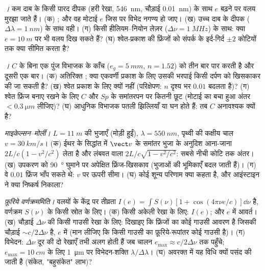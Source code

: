 \begin{exercise}[$\star\star$]\label{exo:b2:michelson:7}
\emph{।} कम दाब के किसी पारद दीपक (हरी रेखा,
\qty{546}{nm}, चौड़ाई \qty{0.01}{nm}) के साथ $e$ बढ़ने पर वलय मुरझा जाते हैं। (क) ; और वह मोटाई $e$ जिस पर विभेद नगण्य हो जाए। (ख) उच्च दाब के
दीपक ($\Delta\lambda = \qty{1}{nm}$) के साथ वही। (ग) किसी हीलियम--नियोन लेज़र
($\Delta\nu = \qty{1}{MHz}$) के साथ: क्या $e = \qty{10}{m}$ पर भी वलय दिख सकते हैं? (घ) श्वेत-प्रकाश
की फ्रिंजों को संपर्क के इर्द-गिर्द $\pm2$ कोटियों तक क्या सीमित करता है?
\end{exercise}

\begin{exercise}[$\star\star$]\label{exo:b2:michelson:8}
\emph{।} $C$ के बिना एक पुंज विभाजक के
काँच ($e_g = \qty{5}{mm}$, $n = 1.52$) को तीन बार पार करती है और दूसरी एक बार। (क)
अतिरिक्त ; क्या एकवर्णी प्रकाश के लिए उसकी भरपाई किसी दर्पण को
खिसकाकर की जा सकती है? (ख) श्वेत प्रकाश के लिए क्यों नहीं (परिक्षेपण: $n$
दृश्य भर $0.01$ बदलता है)? (ग) श्वेत फ्रिंज बनाए रखने के लिए $C$ और $Sp$ के
समांतरपन पर कितनी छूट (मोटाई का बचा हुआ
अंतर $< \qty{0.3}{\micro m}$ लीजिए)? (घ) आधुनिक विभाजक
पतली झिल्लियाँ या घन होते हैं: तब $C$ अनावश्यक क्यों है?
\end{exercise}

\begin{exercise}[$\star\star$]\label{exo:b2:michelson:9}
\emph{माइकेल्सन--मोर्ली।} $L = \qty{11}{m}$ की भुजाएँ (मोड़ी हुईं), $\lambda = \qty{550}{nm}$,
पृथ्वी की कक्षीय चाल $v = \qty{30}{km/s}$। (क) ईथर के सिद्धांत में
$\vect v$ के समांतर भुजा के अनुदिश आना-जाना $2L/c(1 - v^2/c^2)$ लेता है
और लंबवत वाला $2L/c\sqrt{1 - v^2/c^2}$: सबसे नीची कोटि तक अंतर।
(ख) उपकरण को \qty{90}{\degree} घुमाने पर अपेक्षित फ्रिंज-खिसकाव
(भुजाओं की भूमिकाएँ बदल जाती हैं)। (ग) वे $0.01$ फ्रिंज भाँप सकते थे: $v$ पर
ऊपरी सीमा। (घ) कोई शून्य परिणाम क्या कहता है, और आइंस्टाइन ने क्या
निष्कर्ष निकाला?
\end{exercise}

\begin{exercise}[$\star\star\star$]\label{exo:b2:michelson:10}
\emph{फ़ूरिये वर्णक्रममिति।} वलयों के केंद्र पर तीव्रता
$I(e) = \int S(\nu)[1 + \cos(4\pi\nu e/c)]\dd\nu$ है, वर्णक्रम $S(\nu)$ के किसी स्रोत के लिए।
(क) किसी अकेली रेखा के लिए: $I(e)$; और $e$ में आवर्त। (ख) चौड़ाई $\Delta\nu$ की
किसी गाउसी रेखा के लिए: दिखाइए कि फ्रिंजों का कोई गाउसी आवरण है जिसकी
चौड़ाई $\sim c/2\Delta\nu$ है, $e$ में (मान लीजिए कि किसी गाउसी का फ़ूरिये-रूपांतर
कोई गाउसी है)। (ग) विभेदन: $\Delta\nu$ दूर की दो रेखाएँ तभी अलग होती हैं जब
चालन $e_{\max} \approx c/2\Delta\nu$ तक पहुँचे; $e_{\max} = \qty{10}{cm}$ के लिए \qty{1}{\micro m} पर
विभेदन-शक्ति $\lambda/\Delta\lambda$। (घ) अवरक्त में यह विधि
क्यों पसंद की जाती है (संकेत, "बहुसंकेत" लाभ)?
\end{exercise}

